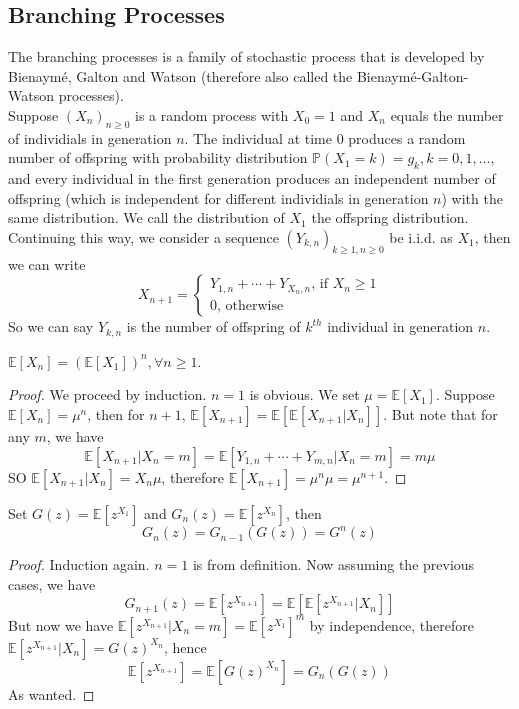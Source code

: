 \subsection{Branching Processes}
The branching processes is a family of stochastic process that is developed by Bienaym\'e, Galton and Watson (therefore also called the Bienaym\'e-Galton-Watson processes).\\
Suppose $(X_n)_{n\ge 0}$ is a random process with $X_0=1$ and $X_n$ equals the number of individials in generation $n$.
The individual at time $0$ produces a random number of offspring with probability distribution $\mathbb P(X_1=k)=g_k,k=0,1,\ldots$, and every individual in the first generation produces an independent number of offspring (which is independent for different individials in generation $n$) with the same distribution.
We call the distribution of $X_1$ the offspring distribution.\\
Continuing this way, we consider a sequence $(Y_{k,n})_{k\ge 1,n\ge 0}$ be i.i.d. as $X_1$, then we can write
$$X_{n+1}=\begin{cases}
    Y_{1,n}+\cdots+Y_{X_n,n}\text{, if $X_n\ge 1$}\\
    0\text{, otherwise}
\end{cases}$$
So we can say $Y_{k,n}$ is the number of offspring of $k^{th}$ individual in generation $n$.
\begin{theorem}
    $\mathbb E[X_n]=(\mathbb E[X_1])^n,\forall n\ge 1$.
\end{theorem}
\begin{proof}
    We proceed by induction.
    $n=1$ is obvious.
    We set $\mu=\mathbb E[X_1]$.
    Suppose $\mathbb E[X_n]=\mu^n$, then for $n+1$, $\mathbb E[X_{n+1}]=\mathbb E[\mathbb E[X_{n+1}|X_n]]$.
    But note that for any $m$, we have
    $$\mathbb E[X_{n+1}|X_n=m]=\mathbb E[Y_{1,n}+\cdots+Y_{m,n}|X_n=m]=m\mu$$
    SO $\mathbb E[X_{n+1}|X_n]=X_n\mu$, therefore $\mathbb E[X_{n+1}]=\mu^n\mu=\mu^{n+1}$.
\end{proof}
\begin{theorem}
    Set $G(z)=\mathbb E[z^{X_1}]$ and $G_n(z)=\mathbb E[z^{X_n}]$, then
    $$G_n(z)=G_{n-1}(G(z))=G^n(z)$$
\end{theorem}
\begin{proof}
    Induction again.
    $n=1$ is from definition.
    Now assuming the previous cases, we have
    $$G_{n+1}(z)=\mathbb E[z^{X_{n+1}}]=\mathbb E[\mathbb E[z^{X_{n+1}}|X_n]]$$
    But now we have $\mathbb E[z^{X_{n+1}}|X_n=m]=\mathbb E[z^{X_1}]^m$ by independence, therefore $\mathbb E[z^{X_{n+1}}|X_n]=G(z)^{X_n}$, hence
    $$\mathbb E[z^{X_{n+1}}]=\mathbb E[G(z)^{X_n}]=G_n(G(z))$$
    As wanted.
\end{proof}
